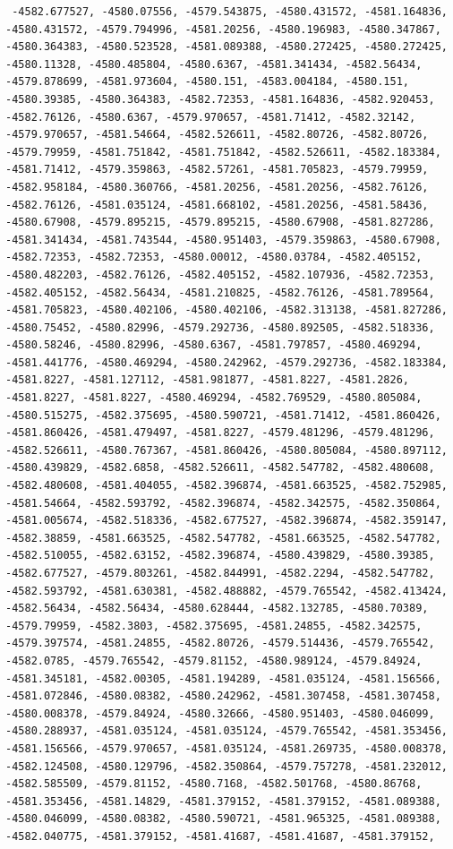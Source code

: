 \documentclass[
]{article}
\begin{document}
\begin{verbatim}
 -4582.677527, -4580.07556, -4579.543875, -4580.431572, -4581.164836,  -4580.431572, -4579.794996, -4581.20256, -4580.196983, -4580.347867,  -4580.364383, -4580.523528, -4581.089388, -4580.272425, -4580.272425,  -4580.11328, -4580.485804, -4580.6367, -4581.341434, -4582.56434,  -4579.878699, -4581.973604, -4580.151, -4583.004184, -4580.151,  -4580.39385, -4580.364383, -4582.72353, -4581.164836, -4582.920453,  -4582.76126, -4580.6367, -4579.970657, -4581.71412, -4582.32142,  -4579.970657, -4581.54664, -4582.526611, -4582.80726, -4582.80726,  -4579.79959, -4581.751842, -4581.751842, -4582.526611, -4582.183384,  -4581.71412, -4579.359863, -4582.57261, -4581.705823, -4579.79959,  -4582.958184, -4580.360766, -4581.20256, -4581.20256, -4582.76126,  -4582.76126, -4581.035124, -4581.668102, -4581.20256, -4581.58436,  -4580.67908, -4579.895215, -4579.895215, -4580.67908, -4581.827286,  -4581.341434, -4581.743544, -4580.951403, -4579.359863, -4580.67908,  -4582.72353, -4582.72353, -4580.00012, -4580.03784, -4582.405152,  -4580.482203, -4582.76126, -4582.405152, -4582.107936, -4582.72353,  -4582.405152, -4582.56434, -4581.210825, -4582.76126, -4581.789564,  -4581.705823, -4580.402106, -4580.402106, -4582.313138, -4581.827286,  -4580.75452, -4580.82996, -4579.292736, -4580.892505, -4582.518336,  -4580.58246, -4580.82996, -4580.6367, -4581.797857, -4580.469294,  -4581.441776, -4580.469294, -4580.242962, -4579.292736, -4582.183384,  -4581.8227, -4581.127112, -4581.981877, -4581.8227, -4581.2826,  -4581.8227, -4581.8227, -4580.469294, -4582.769529, -4580.805084,  -4580.515275, -4582.375695, -4580.590721, -4581.71412, -4581.860426,  -4581.860426, -4581.479497, -4581.8227, -4579.481296, -4579.481296,  -4582.526611, -4580.767367, -4581.860426, -4580.805084, -4580.897112,  -4580.439829, -4582.6858, -4582.526611, -4582.547782, -4582.480608,  -4582.480608, -4581.404055, -4582.396874, -4581.663525, -4582.752985,  -4581.54664, -4582.593792, -4582.396874, -4582.342575, -4582.350864,  -4581.005674, -4582.518336, -4582.677527, -4582.396874, -4582.359147,  -4582.38859, -4581.663525, -4582.547782, -4581.663525, -4582.547782,  -4582.510055, -4582.63152, -4582.396874, -4580.439829, -4580.39385,  -4582.677527, -4579.803261, -4582.844991, -4582.2294, -4582.547782,  -4582.593792, -4581.630381, -4582.488882, -4579.765542, -4582.413424,  -4582.56434, -4582.56434, -4580.628444, -4582.132785, -4580.70389,  -4579.79959, -4582.3803, -4582.375695, -4581.24855, -4582.342575,  -4579.397574, -4581.24855, -4582.80726, -4579.514436, -4579.765542,  -4582.0785, -4579.765542, -4579.81152, -4580.989124, -4579.84924,  -4581.345181, -4582.00305, -4581.194289, -4581.035124, -4581.156566,  -4581.072846, -4580.08382, -4580.242962, -4581.307458, -4581.307458,  -4580.008378, -4579.84924, -4580.32666, -4580.951403, -4580.046099,  -4580.288937, -4581.035124, -4581.035124, -4579.765542, -4581.353456,  -4581.156566, -4579.970657, -4581.035124, -4581.269735, -4580.008378,  -4582.124508, -4580.129796, -4582.350864, -4579.757278, -4581.232012,  -4582.585509, -4579.81152, -4580.7168, -4582.501768, -4580.86768,  -4581.353456, -4581.14829, -4581.379152, -4581.379152, -4581.089388,  -4580.046099, -4580.08382, -4580.590721, -4581.965325, -4581.089388,  -4582.040775, -4581.379152, -4581.41687, -4581.41687, -4581.379152,  
\end{verbatim}
\end{document}
